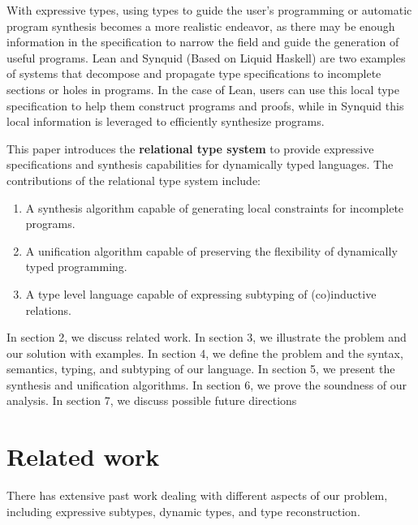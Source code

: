 \documentclass[sigplan]{acmart}
\theoremstyle{definition}
\begin{document}
With expressive types, using types to guide the user's programming or automatic program synthesis 
becomes a more realistic endeavor, as there may be enough information in the specification to narrow the field
and guide the generation of useful programs. Lean and Synquid\cite{} (Based on Liquid Haskell) 
are two examples of systems that decompose and propagate type specifications 
to incomplete sections or holes in programs. 
In the case of Lean, users can use this local type specification to help them construct programs and proofs,
while in Synquid this local information is leveraged to efficiently synthesize programs. 

This paper introduces the \textbf{relational type system} to provide expressive specifications 
and synthesis capabilities for dynamically typed languages. 
The contributions of the relational type system include:
\begin{enumerate}
  \item A synthesis algorithm capable of generating local constraints for incomplete programs. 
  \item A unification algorithm capable of preserving the flexibility of dynamically typed programming. 
  \item A type level language capable of expressing subtyping of (co)inductive relations. 
\end{enumerate}



In section 2, we discuss related work. 
In section 3, we illustrate the problem and our solution with examples.
In section 4, we define the problem and the syntax, semantics, typing, and subtyping of our language.
In section 5, we present the synthesis and unification algorithms.
In section 6, we prove the soundness of our analysis. 
In section 7, we discuss possible future directions

\section{Related work}
There has extensive past work dealing with different aspects of our problem,
including expressive subtypes, dynamic types, and type reconstruction.  
\newline 
\end{document}
